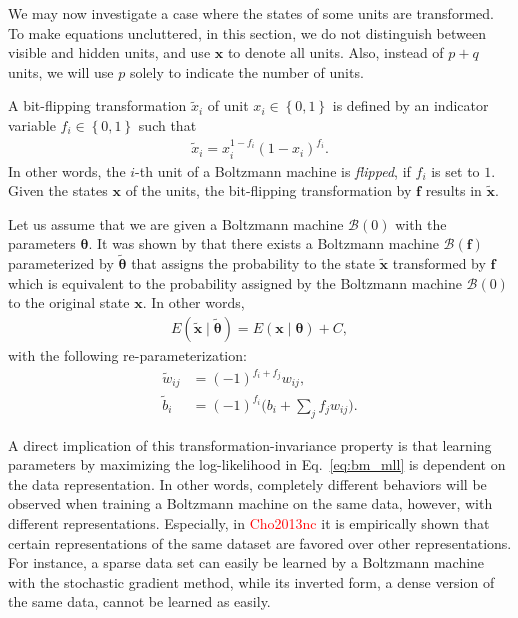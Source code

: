 \documentclass{now}
\newcommand{\vect}[1]{\mathbf{#1}}
\newcommand{\vects}[1]{\boldsymbol{#1}}
\newcommand{\vf}[0]{\vect{f}}
\newcommand{\vx}[0]{\vect{x}}
\newcommand{\TT}[0]{{\vects{\theta}}}
\newcommand{\alert}[1]{\textcolor{red}{#1}}
\newcommand{\BB}[0]{\mathcal{B}}
\newcommand{\citepub}[1]{\alert{#1}}
\begin{document}
We may now investigate a
case where the states of some units are transformed. To make
equations uncluttered, in this section, we do not
distinguish between visible and hidden units, and use $\vx$
to denote all units. Also, instead of $p+q$ units, we will
use $p$ solely to indicate the number of units.

A bit-flipping transformation $\tilde{x}_i$ of unit $x_i
\in \left\{ 0, 1\right\}$ is defined by an indicator
variable $f_i \in \left\{ 0, 1\right\}$ such that 
\begin{align*}
    \tilde{x}_i = x_i^{1 - f_i} \left( 1 - x_i\right)^{f_i}.
\end{align*}
In other words, the $i$-th unit of a Boltzmann machine is
\textit{flipped}, if $f_i$ is set to $1$. Given the states
$\vx$ of the units, the bit-flipping transformation by $\vf$
results in $\tilde{\vx}$.

Let us assume that we are given a Boltzmann machine $\BB(0)$
with the parameters $\TT$. It was shown by \citet{Cho2013nc}
that there exists a Boltzmann machine $\BB(\vf)$
parameterized by $\tilde{\TT}$ that assigns the probability
to the state $\tilde{\vx}$ transformed by $\vf$ which is
equivalent to the probability assigned by the Boltzmann
machine $\BB(0)$ to the original state $\vx$. In other words,
\begin{align*}
    E(\tilde{\vx} \mid \tilde{\TT})  = E(\vx \mid \TT) + C,
\end{align*}
with the following re-parameterization:
\begin{align}
     \label{eq:bm_tilde_w}
     \tilde{w}_{ij} &= (-1)^{f_i+f_j}w_{ij},
 \\
     \label{eq:bm_tilde_b}
     \tilde{b}_i &= (-1)^{f_i}\biggl(b_i + \sum_j f_j w_{ij}
     \biggr).
\end{align}

A direct implication of this transformation-invariance
property is that learning parameters by maximizing the
log-likelihood in Eq.~\eqref{eq:bm_mll} is dependent on the
data representation. In other words, completely different
behaviors will be observed when training a Boltzmann machine
on the same data, however, with different representations.
Especially, in \citepub{Cho2013nc} it is empirically shown that
certain representations of the same dataset are favored over
other representations. For instance, a sparse data set can
easily be learned by a Boltzmann machine with the stochastic
gradient method, while its inverted form, a dense version of
the same data, cannot be learned as easily.
\end{document}
